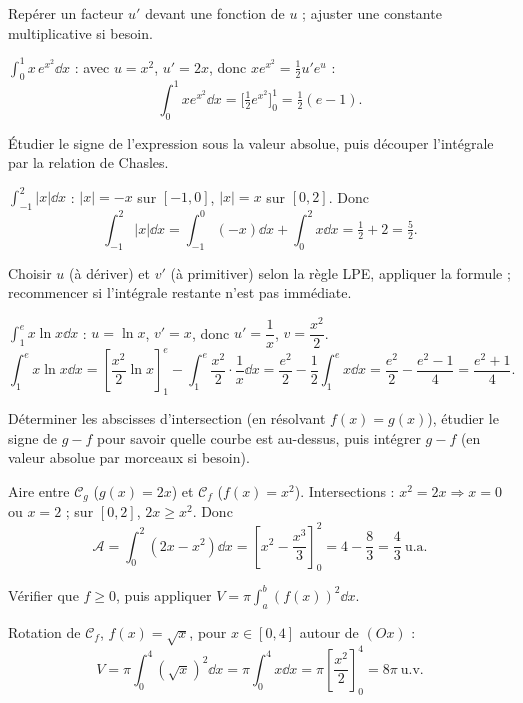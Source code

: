 Repérer un facteur $u'$ devant une fonction de $u$ ; ajuster une constante multiplicative si besoin.
\begin{exemple}
$\displaystyle\int_0^1 x\,e^{x^2}\dd x$ : avec $u=x^2$, $u'=2x$, donc $x e^{x^2}=\tfrac12 u'e^u$ :
\[
\int_0^1 x e^{x^2}\dd x=\Big[\tfrac12 e^{x^2}\Big]_0^1=\tfrac12(e-1).
\]
\end{exemple}

Étudier le signe de l'expression sous la valeur absolue, puis découper l'intégrale par la relation de Chasles.
\begin{exemple}
$\displaystyle\int_{-1}^{2}|x|\dd x$ : $|x|=-x$ sur $[-1,0]$, $|x|=x$ sur $[0,2]$. Donc
\[
\int_{-1}^{2}|x|\dd x=\int_{-1}^0(-x)\dd x+\int_0^2 x\dd x=\tfrac12+2=\tfrac52.
\]
\end{exemple}

Choisir $u$ (à dériver) et $v'$ (à primitiver) selon la règle LPE, appliquer la formule ; recommencer
si l'intégrale restante n'est pas immédiate.
\begin{exemple}
$\displaystyle\int_1^e x\ln x\dd x$ : $u=\ln x$, $v'=x$, donc $u'=\dfrac1x$, $v=\dfrac{x^2}{2}$.
\[
\int_1^e x\ln x\dd x=\left[\frac{x^2}{2}\ln x\right]_1^e-\int_1^e\frac{x^2}{2}\cdot\frac1x\dd x
=\frac{e^2}{2}-\frac12\int_1^e x\dd x=\frac{e^2}{2}-\frac{e^2-1}{4}=\frac{e^2+1}{4}.
\]
\end{exemple}

Déterminer les abscisses d'intersection (en résolvant $f(x)=g(x)$), étudier le signe de $g-f$ pour
savoir quelle courbe est au-dessus, puis intégrer $g-f$ (en valeur absolue par morceaux si besoin).
\begin{exemple}
Aire entre $\mathcal C_g$ ($g(x)=2x$) et $\mathcal C_f$ ($f(x)=x^2$). Intersections : $x^2=2x\Rightarrow x=0$ ou $x=2$ ;
sur $[0,2]$, $2x\ge x^2$. Donc
\[
\mathcal A=\int_0^2(2x-x^2)\dd x=\left[x^2-\frac{x^3}{3}\right]_0^2=4-\frac{8}{3}=\frac{4}{3}\ \text{u.a.}
\]
\end{exemple}

Vérifier que $f\ge0$, puis appliquer $V=\pi\displaystyle\int_a^b (f(x))^2\dd x$.
\begin{exemple}
Rotation de $\mathcal C_f$, $f(x)=\sqrt{x}$, pour $x\in[0,4]$ autour de $(Ox)$ :
\[
V=\pi\int_0^4(\sqrt x)^2\dd x=\pi\int_0^4 x\dd x=\pi\left[\frac{x^2}{2}\right]_0^4=8\pi\ \text{u.v.}
\]
\end{exemple}

